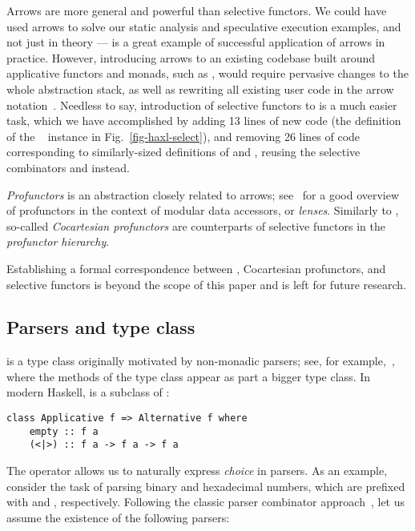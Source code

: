 Arrows are more general and powerful than selective functors. We could have used
arrows to solve our static analysis and speculative execution examples, and not
just in theory --- \Dune is a great example of successful application of arrows
in practice. However, introducing arrows to an existing codebase built around
applicative functors and monads, such as \Haxl, would require pervasive changes
to the whole abstraction stack, as well as rewriting all existing \Haxl user
code in the arrow notation~\citep{paterson2001new}. Needless to say,
introduction of selective functors to \Haxl is a much easier task, which we have
accomplished by adding 13 lines of new code (the definition of the
~ instance in Fig.~\ref{fig-haxl-select}), and removing
26 lines of code corresponding to similarly-sized definitions of  and
, reusing the selective combinators \hs{<||>} and \hs{<&&>} instead.

\emph{Profunctors} is an abstraction closely related to arrows;
see~\citep{pickering2017profunctor} for a good overview of profunctors in the
context of modular data accessors, or \emph{lenses}. Similarly to
, so-called \emph{Cocartesian profunctors} are counterparts of
selective functors in the \emph{profunctor hierarchy}.

Establishing a formal correspondence between , Cocartesian
profunctors, and selective functors is beyond the scope of this paper and is
left for future research.

\subsection{Parsers and  type class}\label{sec-alternative-functors}

 is a type class originally motivated by non-monadic parsers;
see, for example,~\citet{swierstra1996parsers}, where the methods of the
 type class appear as part a bigger  type class. In
modern Haskell,  is a subclass of :

\vspace{1mm}
\begin{verbatim}
class Applicative f => Alternative f where
    empty :: f a
    (<|>) :: f a -> f a -> f a
\end{verbatim}
\vspace{1mm}

\noindent
The operator \hs{<|>} allows us to naturally express \emph{choice} in parsers.
As an example, consider the task of parsing binary and hexadecimal numbers,
which are prefixed with  and , respectively. Following the
classic parser combinator approach~\citep{hutton1998monadic}, let us assume the
existence of the following parsers:

